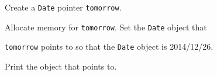Create a \texttt{Date} pointer \texttt{tomorrow}.

Allocate memory for \texttt{tomorrow}. Set the \texttt{Date} object that

\texttt{tomorrow} points to so that the \texttt{Date} object is 2014/12/26.

Print the object that points to.

